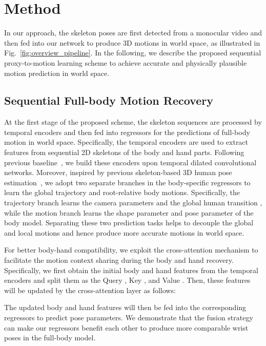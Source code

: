 \documentclass[10pt,twocolumn,letterpaper]{article}
\begin{document}
 \section{Method}
\label{sec:human_motion_recovery}


In our approach, the skeleton poses are first detected from a monocular video and then fed into our network to produce 3D motions in world space, as illustrated in Fig.~\ref{fig:overview_pipeline}.
In the following, we describe the proposed sequential proxy-to-motion learning scheme to achieve accurate and physically plausible motion prediction in world space.


\subsection{Sequential Full-body Motion Recovery}
\label{sec:temporal_motion_convolution}
At the first stage of the proposed scheme, the skeleton sequences are processed by temporal encoders and then fed into regressors for the predictions of full-body motion in world space.
Specifically, the temporal encoders are used to extract features from sequential 2D skeletons of the body and hand parts.
Following previous baseline~\cite{videopose3d2020}, we build these encoders upon temporal dilated convolutional networks.
Moreover, inspired by previous skeleton-based 3D human pose estimation~\cite{Moon_2019_ICCV_3DMPPE, videopose3d2020, poseformer2021, PoseTriplet2022, 2022Ray3D}, we adopt two separate branches in the body-specific regressors to learn the global trajectory and root-relative body motions.
Specifically, the trajectory branch learns the camera parameters  and the global human transition , while the motion branch learns the shape parameter  and pose parameter  of the body model.
Separating these two prediction tasks helps to decouple the global and local motions and hence produce more accurate motions in world space.



For better body-hand compatibility, 
we exploit the cross-attention mechanism to facilitate the motion context sharing during the body and hand recovery.
Specifically, we first obtain the initial body and hand features from the temporal encoders and split them as the Query , Key , and Value .
Then, these features will be updated by the cross-attention layer as follows: 

The updated body and hand features  will then be fed into the corresponding regressors to predict pose parameters.
We demonstrate that the fusion strategy can make our regressors benefit each other to produce more comparable wrist poses in the full-body model.
\end{document}

